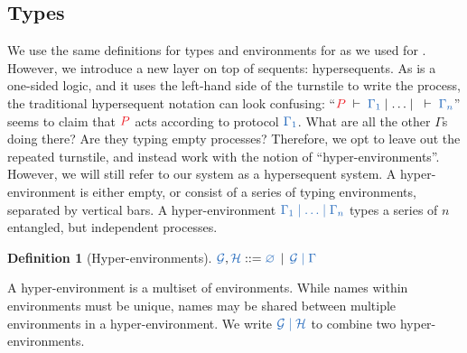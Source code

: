 \documentclass[submission,copyright,creativecommons]{eptcs}
\newtheorem{definition}[lemma]{Definition}
\begin{document}
\subsection{Types}
We use the same definitions for types and environments for \hcp as we used for \cp. However, we introduce a new layer on top of sequents: hypersequents. As \cp is a one-sided logic, and it uses the left-hand side of the turnstile to write the process, the traditional hypersequent notation can look confusing: ``$\seq[P]{\Gamma_1}\hsep\dots\hsep\seq{\Gamma_n}$'' seems to claim that $\tm{P}$ acts according to protocol $\ty{\Gamma_1}$. What are all the other $\Gamma$s doing there? Are they typing empty processes? Therefore, we opt to leave out the repeated turnstile, and instead work with the notion of ``hyper-environments''. However, we will still refer to our system as a hypersequent system. A hyper-environment is either empty, or consist of a series of typing environments, separated by vertical bars. A hyper-environment $\ty{\Gamma_1 \hsep \dots \hsep \Gamma_n}$ types a series of $n$ entangled, but independent processes.
\begin{definition}[Hyper-environments]\label{def:hcp-hyper-environment}
  $\ty{\mathcal{G}}, \ty{\mathcal{H}} ::= \ty{\emptyhypercontext} \, \mid \, \ty{\mathcal{G} \hsep \Gamma}$
\end{definition}\noindent
A hyper-environment is a multiset of environments. While names within environments must be unique, names may be shared between multiple environments in a hyper-environment. We write $\ty{\mathcal{G} \hsep \mathcal{H}}$ to combine two hyper-environments.
\end{document}
